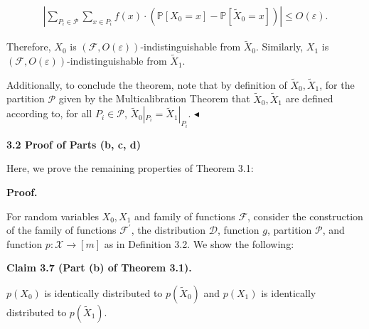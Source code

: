 \documentclass[10pt,a4paper]{article}
\begin{document}
\[\begin{gathered}
\left|\sum_{P_{i}\in\mathcal{P}}\sum_{x\in P_{i}}f(x)\cdot\left(\mathbb{P}[X_{0}=x]-\mathbb{P}[\widetilde{X}_{0}=x]\right)\right|\leq O(\varepsilon).
\end{gathered}\]


Therefore, $X_{0}$ is $(\mathcal{F},O(\varepsilon))$-indistinguishable from $\widetilde{X}_{0}$. Similarly, $X_{1}$ is $(\mathcal{F},O(\varepsilon))$-indistinguishable from $\widetilde{X}_{1}$.\par




Additionally, to conclude the theorem, note that by definition of $\widetilde{X}_{0},\widetilde{X}_{1}$, for the partition $\mathcal{P}$ given by the Multicalibration Theorem that $\widetilde{X}_{0},\widetilde{X}_{1}$ are defined according to, for all $P_{i}\in\mathcal{P}$, $\widetilde{X}_{0}|_{P_{i}}=\widetilde{X}_{1}|_{P_{i}}$.
$\blacktriangleleft$\par






\par\medskip\noindent\textbf{
3.2 Proof of Parts (b, c, d)}\par




Here, we prove the remaining properties of Theorem 3.1:\par




\par\medskip\noindent\textbf{Proof.}\par




For random variables $X_{0},X_{1}$ and family of functions $\mathcal{F}$, consider the construction of the family of functions $\mathcal{F}^{\prime}$, the distribution $\mathcal{D}$, function $g$, partition $\mathcal{P}$, and function $p:\mathcal{X}\to[m]$ as in Definition 3.2. We show the following:\par





\par\medskip\noindent\textbf{
Claim 3.7 (Part (b) of Theorem 3.1). 
}\par



$p(X_{0})$ is identically distributed to $p(\widetilde{X}_{0})$ and $p(X_{1})$ is identically distributed to $p(\widetilde{X}_{1})$.\par
\end{document}
